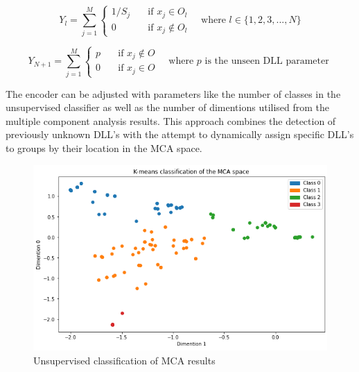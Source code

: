 \documentclass[a4paper,twoside,12pt]{book}
\begin{document}
\begin{equation} \label{enc_eqn}
	Y_{l} = 
	\sum_{j=1}^{M}
	\begin{cases}
		1/S_{j}       & \quad \text{if } x_{j} \in O_{l}\\
		0  & \quad \text{if } x_{j} \notin O_{l}
	  \end{cases} \quad \text{where }l \in \{1, 2, 3, ..., N\}
\end{equation}

\begin{equation} \label{enc_new_eqn}
	Y_{N+1} = 
	\sum_{j=1}^{M}
	\begin{cases}
		p      & \quad \text{if } x_{j} \notin O\\
		0  & \quad \text{if } x_{j} \in O
	  \end{cases} \quad \text{where }p \text{ is the unseen DLL parameter }
\end{equation}

The encoder can be adjusted with parameters like the number of classes in the unsupervised 
classifier as well as the number of dimentions utilised from the multiple component analysis results. 
This approach combines the detection of previously unknown DLL's with the attempt to dynamically
 assign specific DLL's to groups by their location in the MCA space. 


 \begin{figure}
	\centering
	\includegraphics[scale=0.9]{images/KmeanMCA}
	\caption{Unsupervised classification of MCA results}
	\label{fig:kmeanmca}
 \end{figure}
\end{document}
